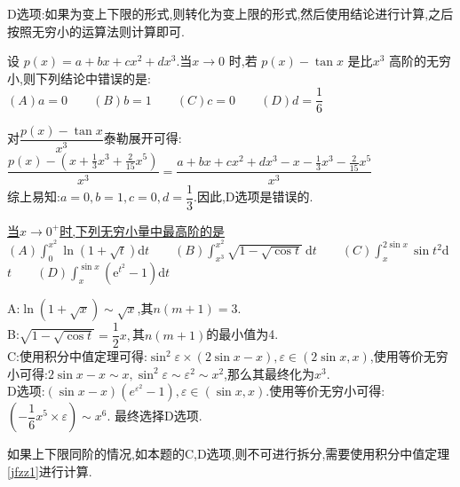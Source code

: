 \documentclass[8pt a4paper, oneside, UTF8]{ctexbook}
\begin{document}
\begin{sloppypar}
    \begin{note}
        D选项:如果为变上下限的形式,则转化为变上限的形式,然后使用结论进行计算,之后按照无穷小的运算法则计算即可.
    \end{note}
    \begin{problem}
        设 $p(x)=a+bx+cx^2+dx^3$.当$x\to0$ 时,若 $p(x)-\tan x$ 是比$x^{3}$ 高阶的无穷小,则下列结论中错误的是:\\
        $(A)a=0 \qquad (B)b=1 \qquad (C)c=0 \qquad (D)d=\dfrac{1}{6}$
    \end{problem}
    \begin{solution}
        对$\dfrac{p(x)-\tan x}{x^3}$泰勒展开可得:$\dfrac{p(x)-(x+\frac13x^3+\frac2{15}x^5)}{x^3}=\dfrac{a+bx+cx^2+dx^3-x-\frac{1}{3}x^3-\frac{2}{15}x^5}{x^3}$\\
        综上易知:$a=0,b=1,c=0,d=\dfrac{1}{3}$.因此,D选项是错误的.
    \end{solution}
    \begin{problem}
        \uline{当$x\to0^+$时,下列无穷小量中最高阶的是} \\
        $(A)\int _0^{x^2}\ln ( 1+ {\sqrt {t}}) $d$t \qquad (B) \int_{x^{3}}^{x^{2}}\sqrt{1-\sqrt{\cos t}}\:\mathrm{d}t \qquad (C)\int _x^{2\sin x}\sin t^2$d$t \qquad (D) \int _x^{\sin x}( \mathrm{e} ^{t^2}- 1) $d$t$  
    \end{problem}
    \begin{solution}
        A:$\ln(1+\sqrt{x}) \sim \sqrt{x}$,其$n(m+1)=3$.\\B:$\sqrt{1-\sqrt{\cos t}}=\dfrac{1}{2}x,$其$n(m+1)$的最小值为4.\\C:使用积分中值定理可得:$\sin^2 \varepsilon \times (2\sin x- x),\varepsilon \in (2\sin x,x)$,使用等价无穷小可得:$2\sin x-x \sim x,\sin^2 \varepsilon \sim \varepsilon ^2 \sim x^2$,那么其最终化为$x^3$.\\D选项:$(\sin x - x)(e^{\varepsilon ^2}-1),\varepsilon \in (\sin x,x)$.使用等价无穷小可得:$(-\dfrac{1}{6}x^5 \times \varepsilon)\sim x^6$. 最终选择D选项.
    \end{solution}
    \begin{note}
        如果上下限同阶的情况,如本题的C,D选项,则不可进行拆分,需要使用积分中值定理\ref{jfzz1}进行计算.
    \end{note}

\end{sloppypar}
\end{document}
